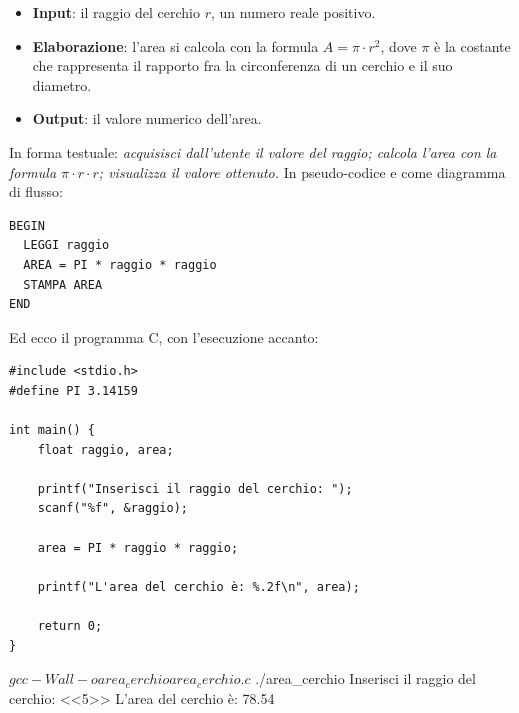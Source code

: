 \begin{itemize}
  \item \textbf{Input}: il raggio del cerchio $r$, un numero reale positivo.
  \item \textbf{Elaborazione}: l'area si calcola con la formula
        $A = \pi \cdot r^2$, dove $\pi$ è la costante che rappresenta il
        rapporto fra la circonferenza di un cerchio e il suo diametro.
  \item \textbf{Output}: il valore numerico dell'area.
\end{itemize}

In forma testuale: \textit{acquisisci dall'utente il valore del raggio;
calcola l'area con la formula $\pi \cdot r \cdot r$; visualizza il valore
ottenuto.} In pseudo-codice e come diagramma di flusso:

\begin{affianco}[0.42][c]
\begin{lstlisting}[style=pseudo, name=pseudocodice]
BEGIN
  LEGGI raggio
  AREA = PI * raggio * raggio
  STAMPA AREA
END
\end{lstlisting}
\risultato
\begin{immagine}
\end{immagine}
\end{affianco}

Ed ecco il programma C, con l'esecuzione accanto:

\begin{affianco}[0.55]
\begin{lstlisting}[style=c, name=area_cerchio.c]
#include <stdio.h>
#define PI 3.14159

int main() {
    float raggio, area;

    printf("Inserisci il raggio del cerchio: ");
    scanf("%f", &raggio);

    area = PI * raggio * raggio;

    printf("L'area del cerchio è: %.2f\n", area);

    return 0;
}
\end{lstlisting}
\risultato
\begin{console}
$ gcc -Wall -o area_cerchio area_cerchio.c
$ ./area_cerchio
Inserisci il raggio del cerchio: <<5>>
L'area del cerchio è: 78.54
\end{console}
\end{affianco}

